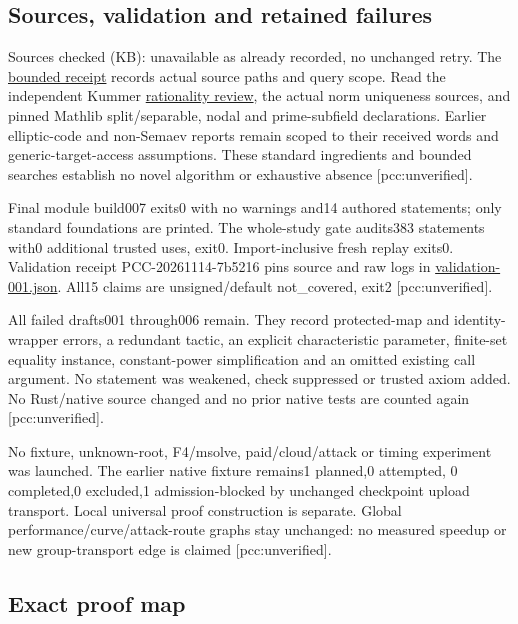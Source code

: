 \documentclass[
  10pt,
]{article}
\begin{document}
\subsection{Sources, validation and retained
failures}\label{sources-validation-and-retained-failures}

Sources checked (KB): unavailable as already recorded, no unchanged
retry. The
\href{../split-base-descent-evidence/prior-search-receipt.json}{bounded
receipt} records actual source paths and query scope. Read the
independent Kummer
\href{https://github.com/isogeny-labs/crypto/blob/f87e25bb0b50a5ce137eaa33fc733d317a2f0981/research/prime_one_shot_20261029/continuation/reviews/rationality.md}{rationality
review}, the actual norm uniqueness sources, and pinned Mathlib
split/separable, nodal and prime-subfield declarations. Earlier
elliptic-code and non-Semaev reports remain scoped to their received
words and generic-target-access assumptions. These standard ingredients
and bounded searches establish no novel algorithm or exhaustive absence
{[}pcc:unverified{]}.

Final module build007 exits0 with no warnings and14 authored statements;
only standard foundations are printed. The whole-study gate audits383
statements with0 additional trusted uses, exit0. Import-inclusive fresh
replay exits0. Validation receipt PCC-20261114-7b5216 pins source and
raw logs in
\href{../split-base-descent-evidence/validation-001.json}{validation-001.json}.
All15 claims are unsigned/default not\_covered, exit2
{[}pcc:unverified{]}.

All failed drafts001 through006 remain. They record protected-map and
identity-wrapper errors, a redundant tactic, an explicit characteristic
parameter, finite-set equality instance, constant-power simplification
and an omitted existing call argument. No statement was weakened, check
suppressed or trusted axiom added. No Rust/native source changed and no
prior native tests are counted again {[}pcc:unverified{]}.

No fixture, unknown-root, F4/msolve, paid/cloud/attack or timing
experiment was launched. The earlier native fixture remains1 planned,0
attempted, 0 completed,0 excluded,1 admission-blocked by unchanged
checkpoint upload transport. Local universal proof construction is
separate. Global performance/curve/attack-route graphs stay unchanged:
no measured speedup or new group-transport edge is claimed
{[}pcc:unverified{]}.

\subsection{Exact proof map}\label{exact-proof-map}
\end{document}
